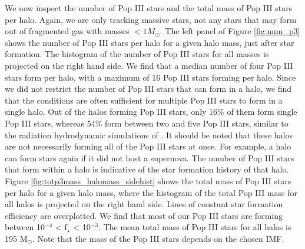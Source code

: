\documentclass[fleqn,usenatbib]{mnras}
\begin{document}
We now inspect the number of Pop III stars and the total mass of Pop III stars per halo. Again, we are only tracking massive stars, not any stars that may form out of fragmented gas with masses $<1 M_{\odot}$. The left panel of Figure \ref{fig:num_p3} shows the number of Pop III stars per halo for a given halo mass, just after star formation. The histogram of the number of Pop III stars for all masses is projected on the right hand side. We find that a median number of four Pop III stars form per halo, with a maximum of 16 Pop III stars forming per halo. Since we did not restrict the number of Pop III stars that can form in a halo, we find that the conditions are often sufficient for multiple Pop III stars to form in a single halo. Out of the halos forming Pop III stars, only 16\% of them form single Pop III stars, whereas 54\% form between two and five Pop III stars, similar to the radiation hydrodynamic simulations of \citet{Susa13, Susa14}. It should be noted that these halos are not necessarily forming all of the Pop III stars at once. For example, a halo can form stars again if it did not host a supernova. The number of Pop III stars that form within a halo is indicative of the star formation history of that halo. Figure \ref{fig:totp3mass_halomass_sidehist} shows the total mass of Pop III stars per halo for a given halo mass, where the histogram of the total Pop III mass for all halos is projected on the right hand side. Lines of constant star formation efficiency are overplotted. We find that most of our Pop III stars are forming between 10$^{-4}$ < f$_\star$ < 10$^{-3}$. The mean total mass of Pop III stars for all halos is 195 M$_{\odot}$. Note that the mass of the Pop III stars depends on the chosen IMF. 
\end{document}
